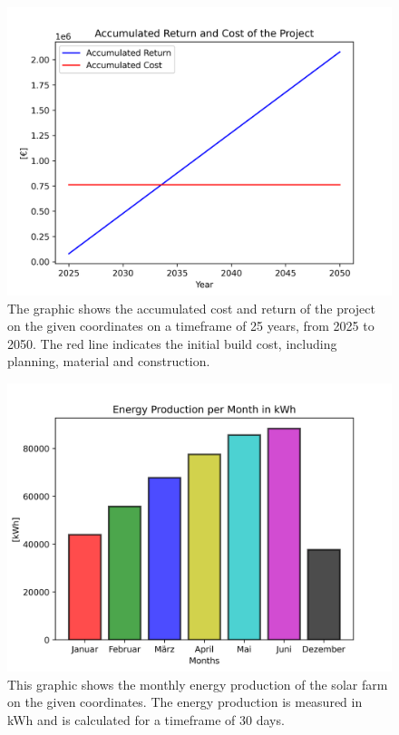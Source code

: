 \documentclass[12pt, a4paper, notitlepage]{scrreprt}
\begin{document}
        \begin{figure}
        \centering
        \includegraphics[scale = 0.7]{images/Akkumulierter_Ertrag.png}
        \caption {The graphic shows the accumulated cost and return of the project on the given coordinates on a timeframe of 25 years, from 2025 to 2050. The red line indicates the initial build cost,
        including planning, material and construction.}\label{Projektkosten}
        \end
        {figure}


        \begin{figure}
        \centering
        \includegraphics[scale = 0.7]{images/Stromerzeugung_pro_Monat.png}
        \caption{This graphic shows the monthly energy production of the solar farm on the given coordinates. The energy production is measured in kWh and is calculated for a timeframe of 30 days.}\label{Stromerzeugung}
        \label{Stromerzeugung}
        \end
        {figure}



        
\end{document}
